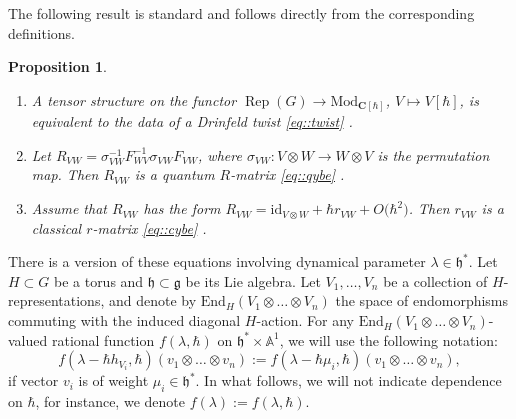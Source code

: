 \documentclass[11pt]{article}
\numberwithin{equation}{section}
\newtheorem{Proposition}[Theorem]{Proposition}
{ \theoremstyle{definition}
	\newtheorem{Definition}[Theorem]{Definition}
	\newtheorem{Note}[Theorem]{Note}
	\newtheorem{Example}[Theorem]{Example}
	\newtheorem{Remark}[Theorem]{Remark} }
\newcommand{\C}{\mathbf{C}}
\newcommand{\g}{\mathfrak{g}}
\newcommand{\h}{\mathfrak{h}}
\newcommand{\Mod}[1]{{\mathrm{Mod}}_{#1}}
\newcommand{\End}{\mathrm{End}}
\newcommand{\id}{\mathrm{id}}
\DeclareMathOperator{\Rep}{Rep}
\begin{document}
	The following result is standard and follows directly from the corresponding definitions.
	\begin{Proposition}\qquad
		\begin{enumerate}\itemsep=0pt
			\item[$(1)$] A tensor structure on the functor
$
			\Rep(G) \rightarrow \Mod{\C[\hbar]}$, $ V \mapsto V[\hbar]$,
			is equivalent to the data of a Drinfeld twist \eqref{eq::twist} {\rm\cite[\emph{Definition} 2.4.1]{EGNO}}.
			\item[$(2)$] Let $R_{VW} = \sigma_{VW}^{-1} F_{WV}^{-1} \sigma_{VW} F_{VW}$, where $\sigma_{VW} \colon V \otimes W \rightarrow W \otimes V$ is the permutation map. Then $R_{VW}$ is a quantum $R$-matrix \eqref{eq::qybe} {\rm\cite[\emph{Definition} 8.1.1]{EGNO}}.
			\item[$(3)$] Assume that $R_{VW}$ has the form $R_{VW} = \id_{V \otimes W} + \hbar r_{VW} + O\bigl(\hbar^2\bigr)$. Then $r_{VW}$ is a classical $r$-matrix \eqref{eq::cybe} {\rm\cite[\emph{Proposition} 9.4]{EtingofSchiffmannQuantumGroups}}.
		\end{enumerate}
	\end{Proposition}
	
	There is a version of these equations involving dynamical parameter $\lambda \in \h^*$. Let $H \subset G$ be a torus and $\h \subset \g$ be its Lie algebra. Let $V_1,\dots,V_n$ be a collection of $H$-representations, and denote by $\End_{H}(V_1 \otimes \dots \otimes V_n)$ the space of endomorphisms commuting with the induced diagonal $H$-action. For any $\End_{H}(V_1 \otimes \dots \otimes V_n)$-valued rational function $f(\lambda,\hbar)$ on $\h^*\times \mathbb{A}^1$, we will use the following notation:
	\[
	f(\lambda-\hbar h_{V_i},\hbar) (v_1 \otimes \dots \otimes v_n) := f(\lambda - \hbar \mu_i,\hbar) (v_1\otimes \dots \otimes v_n),
	\]
	if vector $v_i$ is of weight $\mu_i \in \h^*$. In what follows, we will not indicate dependence on $\hbar$, for instance, we denote $f(\lambda):=f(\lambda,\hbar)$.
	
\end{document}
